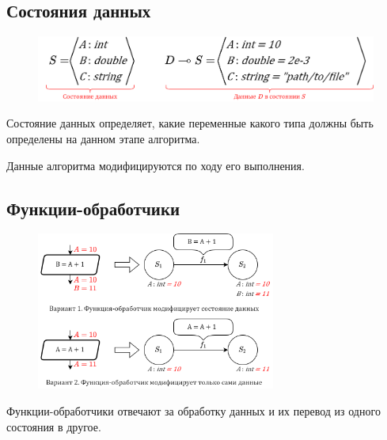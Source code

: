 ﻿%
\subsection{Состояния данных}
\begin{frame}
	\begin{figure}
		\centering
		\includegraphics[width=\textwidth]{images/illustration.datastate.png}
	\end{figure}
	Состояние данных определяет, какие переменные какого типа должны быть определены на данном этапе алгоритма.

	Данные алгоритма модифицируются по ходу его выполнения.
\end{frame}

\subsection{Функции-обработчики}
\begin{frame}
	\begin{figure}
		\centering
		\includegraphics[width=0.7\textwidth]{images/illustration.transfer.png}
	\end{figure}

	Функции-обработчики отвечают за обработку данных и их перевод из одного состояния в другое.
\end{frame}


